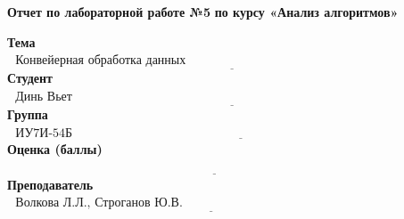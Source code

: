 \begin{titlepage}
	
	\begin{center}
		\Large\textbf{Отчет по лабораторной работе №5}
		\Large\textbf {по курсу «Анализ алгоритмов»}
	\end{center}
	
	\noindent\textbf{Тема} $\underline{\text{~~Конвейерная обработка данных ~~~~~~~~~~~~~~~~~~~~~~~~~~~~~~~~~~~~~~~~~~~~~~~~~~~~~~~~~~~~~~~~~~~~~}}$\newline\newline\newline
	\noindent\textbf{Студент} $\underline{\text{~~Динь Вьет Ань~~~~~~~~~~~~~~~~~~~~~~~~~~~~~~~~~~~~~~~~~~~~~~~~~~~~~~~~~~~~~~~~~~~~~~~~~~~~~~~~~~~~~~~~~}}$\newline\newline
	\noindent\textbf{Группа} $\underline{\text{~~ИУ7И-54Б~~~~~~~~~~~~~~~~~~~~~~~~~~~~~~~~~~~~~~~~~~~~~~~~~~~~~~~~~~~~~~~~~~~~~~~~~~~~~~~~~~~~~~~~~~~~~~~~~}}$\newline\newline
	\noindent\textbf{Оценка (баллы)} $\underline{\text{~~~~~~~~~~~~~~~~~~~~~~~~~~~~~~~~~~~~~~~~~~~~~~~~~~~~~~~~~~~~~~~~~~~~~~~~~~~~~~~~~~~~~~~~~~~~~~~~~~~~}}$\newline\newline
	\noindent\textbf{Преподаватель} $\underline{\text{~~Волкова Л.Л.,~Строганов Ю.В.~~~~~~~~~~~~~~~~~~~~~~~~~~~~~~~~~~~~~~~~~~~~~~~~~~~~~~~~}}$\newline
	\restoregeometry
\end{titlepage}

